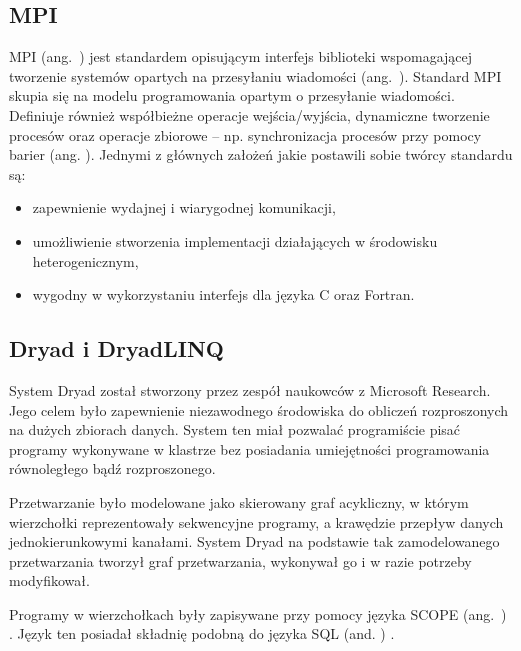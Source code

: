 \subsection{MPI}

MPI (ang.~) \cite{MPI-Standard-Version-3,Using-MPI-Portable-Parallel-Programming-with-the-Message-Passing-Interface}
jest standardem opisującym interfejs biblioteki wspomagającej tworzenie
systemów opartych na przesyłaniu wiadomości (ang.~).
Standard MPI skupia się na modelu programowania opartym o przesyłanie
wiadomości. Definiuje również współbieżne operacje wejścia/wyjścia,
dynamiczne tworzenie procesów oraz operacje zbiorowe -- np. synchronizacja
procesów przy pomocy barier (ang. ).
Jednymi z głównych założeń jakie postawili sobie twórcy standardu
są:
\begin{itemize}
\item zapewnienie wydajnej i wiarygodnej komunikacji,
\item umożliwienie stworzenia implementacji działających w środowisku heterogenicznym,
\item wygodny w wykorzystaniu interfejs dla języka C oraz Fortran.
\end{itemize}

\subsection{Dryad i DryadLINQ}

System Dryad \cite{Microsoft-Research-Dryad} został stworzony przez
zespół naukowców z Microsoft Research. Jego celem było zapewnienie
niezawodnego środowiska do obliczeń rozproszonych na dużych zbiorach
danych. System ten miał pozwalać programiście pisać programy wykonywane
w klastrze bez posiadania umiejętności programowania równoległego
bądź rozproszonego.

Przetwarzanie było modelowane jako skierowany graf acykliczny, w którym
wierzchołki reprezentowały sekwencyjne programy, a krawędzie przepływ
danych jednokierunkowymi kanałami. System Dryad na podstawie tak zamodelowanego
przetwarzania tworzył graf przetwarzania, wykonywał go i w razie potrzeby
modyfikował.

Programy w wierzchołkach były zapisywane przy pomocy języka SCOPE
\linebreak{}
(ang.~)
\cite{SCOPE}. Język ten posiadał składnię podobną do języka SQL (and.
) \cite{SQL}.

